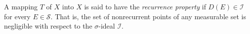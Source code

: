 A mapping $T$ of $X$ into $X$ is said to have the \textit{recurrence property} if $D(E) \in \mathcal{I}$ for every $E \in \mathcal{S}$. That is, the set of nonrecurrent points of any measurable set is negligible with respect to the $\sigma$-ideal $\mathcal{I}$.
